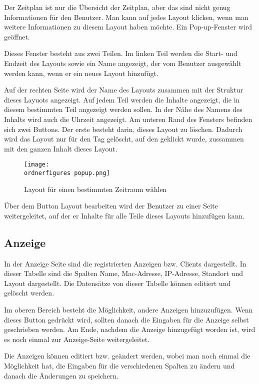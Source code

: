 Der Zeitplan ist nur die Übersicht der Zeitplan, aber das sind nicht genug Informationen für den Benutzer. Man kann auf jedes Layout klicken, wenn man weitere Informationen zu diesem Layout haben möchte. Ein Pop-up-Fenster wird geöffnet. 

Dieses Fenster besteht aus zwei Teilen. Im linken Teil werden die Start- und Endzeit des Layouts sowie ein Name angezeigt, der vom Benutzer ausgewählt werden kann, wenn er ein neues Layout hinzufügt.

Auf der rechten Seite wird der Name des Layouts zusammen mit der Struktur dieses Layuots angezeigt.
Auf jedem Teil werden die Inhalte angezeigt, die in diesem bestimmten Teil angezeigt werden sollen. In der Nähe des Namens des Inhalts wird auch die Uhrzeit angezeigt.
Am unteren Rand des Fensters befinden sich zwei Buttons. Der erste besteht darin, dieses Layout zu löschen. Dadurch wird das Layout nur für den Tag gelöscht, auf den geklickt wurde, zussammen mit den ganzen Inhalt dieses Layout.

\begin{figure}[ht]
	\centering
	\texttt{[image: \\ordnerfigures popup.png]}
	\caption{Layout  für einen bestimmten Zeitraum wählen}
	\label{fi:popup}
\end{figure}

Über dem Button Layout bearbeiten wird der Benutzer zu einer Seite weitergeleitet, auf der er Inhalte für alle Teile dieses Layouts hinzufügen kann.


\subsection{Anzeige}

In der Anzeige Seite sind die registrierten Anzeigen bzw. Clients dargestellt. In dieser Tabelle sind die Spalten Name, Mac-Adresse, IP-Adresse, Standort und Layout dargestellt. Die Datensätze von dieser Tabelle können editiert und gelöscht werden. 

Im oberen Bereich besteht die Möglichkeit, andere Anzeigen hinzuzufügen.
Wenn dieses Button gedr\"uckt wird, sollten danach die Eingaben für die Anzeige selbst geschrieben werden. Am Ende, nachdem die Anzeige hinzugefügt worden ist, wird es noch einmal zur Anzeige-Seite weitergeleitet.

Die Anzeigen können editiert bzw. geändert werden, wobei man noch einmal die Möglichkeit hat, die Eingaben für die verschiedenen Spalten zu ändern und danach die Änderungen zu speichern.


